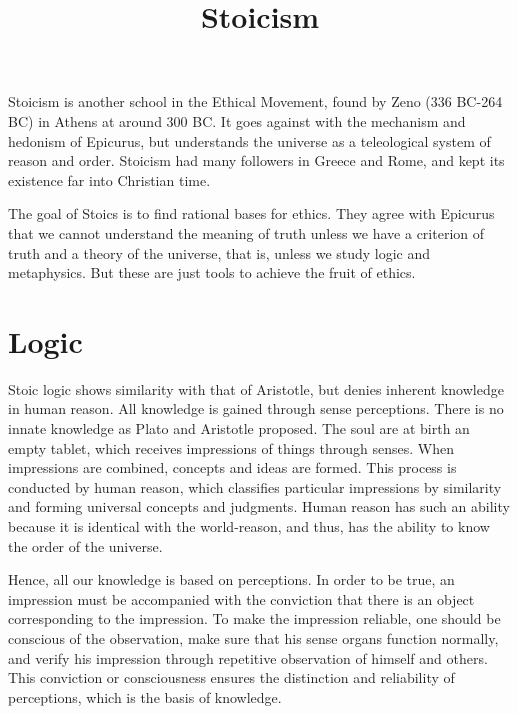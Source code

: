 \documentclass[11pt]{article}
\title{Stoicism}
\date{}
\begin{document}
  \maketitle

  \linenumbers

Stoicism is another school in the Ethical Movement, found by Zeno (336 BC-264 BC) in Athens at around 300 BC. 
It goes against with the mechanism and hedonism of Epicurus, but understands the universe as a teleological system of reason and order. 
Stoicism had many followers in Greece and Rome, and kept its existence far into Christian time.

\newline

The goal of Stoics is to find rational bases for ethics. 
They agree with Epicurus that we cannot understand the meaning of truth unless we have a criterion of truth and a theory of the universe, that is, unless we study logic and metaphysics. 
But these are just tools to achieve the fruit of ethics.

\section{Logic}
Stoic logic shows similarity with that of Aristotle, but denies inherent knowledge in human reason. 
All knowledge is gained through sense perceptions. 
There is no innate knowledge as Plato and Aristotle proposed. 
The soul are at birth an empty tablet, which receives impressions of things through senses. 
When impressions are combined, concepts and ideas are formed. 
This process is conducted by human reason, which classifies particular impressions by similarity and forming universal concepts and judgments. 
Human reason has such an ability because it is identical with the world-reason, and thus, has the ability to know the order of the universe.

\newline

Hence, all our knowledge is based on perceptions. 
In order to be true, an impression must be accompanied with the conviction that there is an object corresponding to the impression. 
To make the impression reliable, one should be conscious of the observation, make sure that his sense organs function normally, and verify his impression through repetitive observation of himself and others. 
This conviction or consciousness ensures the distinction and reliability of perceptions, which is the basis of knowledge.
\end{document}
